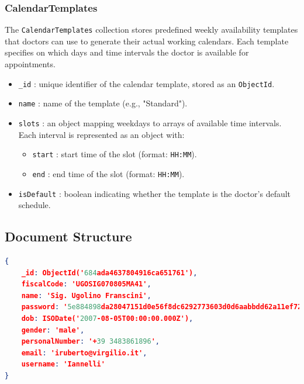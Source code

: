 \subsubsection{CalendarTemplates}
The \texttt{CalendarTemplates} collection stores predefined weekly availability templates that doctors can use to generate their actual working calendars. Each template specifies on which days and time intervals the doctor is available for appointments.

\begin{itemize}
  \item \texttt{\_id} : unique identifier of the calendar template, stored as an \texttt{ObjectId}.
  \item \texttt{name} : name of the template (e.g., "Standard").
  \item \texttt{slots} : an object mapping weekdays to arrays of available time intervals. Each interval is represented as an object with:
  \begin{itemize}
    \item \texttt{start} : start time of the slot (format: \texttt{HH:MM}).
    \item \texttt{end} : end time of the slot (format: \texttt{HH:MM}).
  \end{itemize}
  \item \texttt{isDefault} : boolean indicating whether the template is the doctor's default schedule.
\end{itemize}

\subsection{Document Structure}

\begin{lstlisting}[language=json, caption={Example of a User Document}]
{
    _id: ObjectId('684ada4637804916ca651761'),
    fiscalCode: 'UGOSIG070805MA41',
    name: 'Sig. Ugolino Franscini',
    password: '5e884898da28047151d0e56f8dc6292773603d0d6aabbdd62a11ef721d1542d8',
    dob: ISODate('2007-08-05T00:00:00.000Z'),
    gender: 'male',
    personalNumber: '+39 3483861896',
    email: 'iruberto@virgilio.it',
    username: 'Iannelli'
}
\end{lstlisting}

